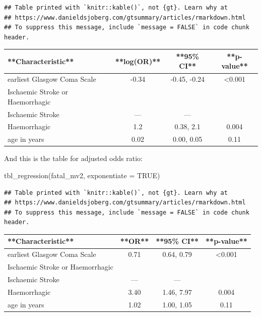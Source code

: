 \documentclass[
  10pt,
]{krantz}
\newenvironment{Shaded}{\begin{snugshade}}{\end{snugshade}}
\newcommand{\AttributeTok}[1]{\textcolor[rgb]{0.77,0.63,0.00}{#1}}
\newcommand{\ConstantTok}[1]{\textcolor[rgb]{0.00,0.00,0.00}{#1}}
\newcommand{\FunctionTok}[1]{\textcolor[rgb]{0.00,0.00,0.00}{#1}}
\newcommand{\NormalTok}[1]{#1}
\begin{document}
\begin{verbatim}
## Table printed with `knitr::kable()`, not {gt}. Learn why at
## https://www.danieldsjoberg.com/gtsummary/articles/rmarkdown.html
## To suppress this message, include `message = FALSE` in code chunk header.
\end{verbatim}

\begin{tabular}{l|c|c|c}
\hline
**Characteristic** & **log(OR)** & **95\% CI** & **p-value**\\
\hline
earliest Glasgow Coma Scale & -0.34 & -0.45, -0.24 & <0.001\\
\hline
Ischaemic Stroke or Haemorrhagic &  &  & \\
\hline
Ischaemic Stroke & — & — & \\
\hline
Haemorrhagic & 1.2 & 0.38, 2.1 & 0.004\\
\hline
age in years & 0.02 & 0.00, 0.05 & 0.11\\
\hline
\end{tabular}

And this is the table for adjusted odds ratio:

\begin{Shaded}
\begin{Highlighting}[]
\FunctionTok{tbl\_regression}\NormalTok{(fatal\_mv2, }\AttributeTok{exponentiate =} \ConstantTok{TRUE}\NormalTok{)}
\end{Highlighting}
\end{Shaded}

\begin{verbatim}
## Table printed with `knitr::kable()`, not {gt}. Learn why at
## https://www.danieldsjoberg.com/gtsummary/articles/rmarkdown.html
## To suppress this message, include `message = FALSE` in code chunk header.
\end{verbatim}

\begin{tabular}{l|c|c|c}
\hline
**Characteristic** & **OR** & **95\% CI** & **p-value**\\
\hline
earliest Glasgow Coma Scale & 0.71 & 0.64, 0.79 & <0.001\\
\hline
Ischaemic Stroke or Haemorrhagic &  &  & \\
\hline
Ischaemic Stroke & — & — & \\
\hline
Haemorrhagic & 3.40 & 1.46, 7.97 & 0.004\\
\hline
age in years & 1.02 & 1.00, 1.05 & 0.11\\
\hline
\end{tabular}
\end{document}
